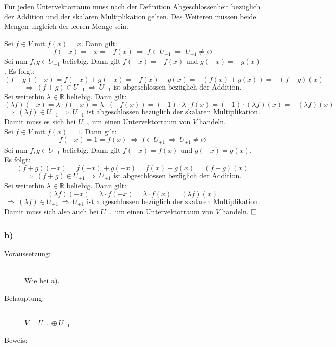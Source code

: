 \documentclass[10pt, a4paper]{article}
\begin{document}
		Für jeden Untervektorraum muss nach der Definition Abgeschlossenheit bezüglich der Addition und der skalaren Multiplikation gelten. Des Weiteren müssen beide Mengen ungleich der leeren Menge sein.

		Sei $f \in V$ mit $f(x) = x$. Dann gilt:
		\[
			f(-x) = -x = -f(x) \ \Rightarrow \ f \in U_{-1} \ \Rightarrow \ U_{-1} \neq \varnothing
		\]
		Sei nun $f,g \in U_{-1}$ beliebig. Dann gilt $f(-x)=-f(x)$ und $g(-x)=-g(x)$. Es folgt:
		\[
			(f+g)(-x) = f(-x) + g(-x) = -f(x) -g(x) = -(f(x)+g(x)) = -(f+g)(x)
		\]
		\[
			\Rightarrow \ (f+g) \in U_{-1} \ \Rightarrow \ U_{-1} \text{ ist abgeschlossen bezüglich der Addition.}
		\]
		Sei weiterhin $\lambda \in \mathbb{R}$ beliebig. Dann gilt:
		\[
			(\lambda f)(-x) = \lambda \cdot f(-x) = \lambda\cdot (-f(x)) = (-1)\cdot \lambda \cdot f(x) = (-1)\cdot (\lambda f)(x) = -(\lambda f)(x)
		\]
		\[
			\Rightarrow \ (\lambda f)\in U_{-1} \ \Rightarrow \ U_{-1} \text{ ist abgeschlossen bezüglich der skalaren Multiplikation.}
		\]
		Damit muss es sich bei $U_{-1}$ um einen Untervektorraum von $V$ handeln.\\

		Sei $f \in V$ mit $f(x) = 1$. Dann gilt:
		\[
			f(-x) = 1 = f(x) \ \Rightarrow \ f \in U_{+1} \ \Rightarrow \ U_{+1} \neq \varnothing
		\]
		Sei nun $f,g \in U_{-1}$ beliebig. Dann gilt $f(-x)=f(x)$ und $g(-x)=g(x)$. Es folgt:
		\[
			(f+g)(-x) = f(-x) + g(-x) = f(x) + g(x) = (f+g)(x)
		\]
		\[
			\Rightarrow \ (f+g)\in U_{+1} \ \Rightarrow \ U_{+1} \text{ ist abgeschlossen bezüglich der Addition.}
		\]
		Sei weiterhin $\lambda \in \mathbb{R}$ beliebig. Dann gilt:
		\[
			(\lambda f)(-x) = \lambda \cdot f(-x) = \lambda \cdot f(x) = (\lambda f)(x)
		\]
		\[
			\Rightarrow \ (\lambda f)\in U_{+1} \ \Rightarrow \ U_{+1} \text{ ist abgeschlossen bezüglich der skalaren Multiplikation.}
		\]
		Damit muss sich also auch bei $U_{+1}$ um einen Untervektorraum von $V$ handeln. $\hfill\Box$
		
	\subsubsection*{b)} %
	\label{ssub:b_}
	
		\begin{description}
			\item[Voraussetzung:] \hfill \\
				Wie bei a).
			\item[Behauptung:] \hfill \\
				$V = U_{+1} \oplus U_{-1}$
			\item[Beweis:]
		\end{description}
		
\end{document}
